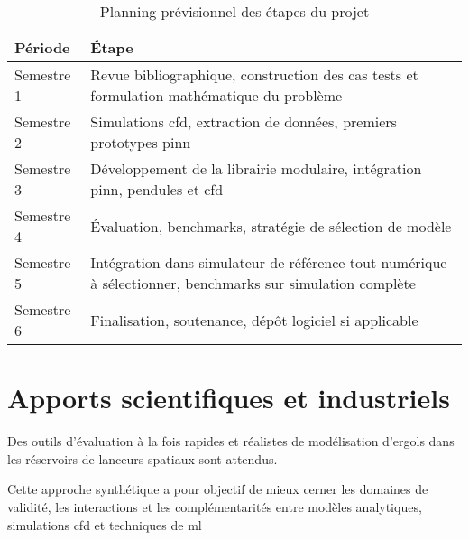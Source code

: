 \documentclass[12pt]{article}
\begin{document}
	\begin{table}[h]
		\centering
		\begin{tabularx}{\textwidth}{l X}
			
			\hline
			
			Période & Étape \\
			
			\hline
			
			Semestre 1 & Revue bibliographique, construction des cas tests et formulation mathématique du problème \\
			Semestre 2 & Simulations \acrshort{cfd}, extraction de données, premiers prototypes \acrshort{pinn} \\
			Semestre 3 & Développement de la librairie modulaire, intégration \acrshort{pinn}, pendules et \acrshort{cfd} \\
			Semestre 4 & Évaluation, benchmarks, stratégie de sélection de modèle \\
			Semestre 5 & Intégration dans simulateur de référence tout numérique à sélectionner, benchmarks sur simulation complète \\
			Semestre 6 & Finalisation, soutenance, dépôt logiciel si applicable \\
			
			\hline
			
		\end{tabularx}
		\caption{Planning prévisionnel des étapes du projet}
	\end{table}	
	
	\section*{Apports scientifiques et industriels}
	
	Des outils d'évaluation à la fois rapides et réalistes de modélisation d'ergols dans les réservoirs de lanceurs spatiaux sont attendus.
	
	Cette approche synthétique a pour objectif de mieux cerner les domaines de validité, les interactions et les complémentarités entre modèles analytiques, simulations \acrshort{cfd} et techniques de \acrlong{ml}
	
\end{document}
